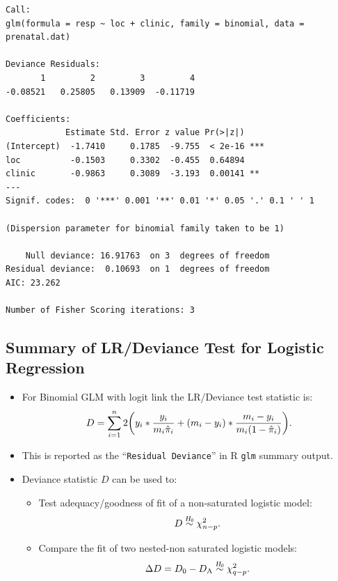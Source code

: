 \documentclass[oneside]{book}\usepackage[]{graphicx}\usepackage[svgnames]{xcolor}
\makeatletter
\newenvironment{kframe}{%
 \def\at@end@of@kframe{}%
 \ifinner\ifhmode%
  \def\at@end@of@kframe{\end{minipage}}%
  \begin{minipage}{\columnwidth}%
 \fi\fi%
 \def\FrameCommand##1{\hskip\@totalleftmargin \hskip-\fboxsep
 \colorbox{shadecolor}{##1}\hskip-\fboxsep
     \hskip-\linewidth \hskip-\@totalleftmargin \hskip\columnwidth}%
 \MakeFramed {\advance\hsize-\width
   \@totalleftmargin\z@ \linewidth\hsize
   \@setminipage}}%
 {\par\unskip\endMakeFramed%
 \at@end@of@kframe}
\newenvironment{knitrout}{}{} %
\let\log\relax%
\newcommand{\HN}{\textsl{H}_{\textsl{0}}}%
\makeatother
\begin{document}
\begin{itemize}
\begin{knitrout}
\begin{kframe}
\begin{verbatim}
Call:
glm(formula = resp ~ loc + clinic, family = binomial, data = prenatal.dat)

Deviance Residuals: 
       1         2         3         4  
-0.08521   0.25805   0.13909  -0.11719  

Coefficients:
            Estimate Std. Error z value Pr(>|z|)    
(Intercept)  -1.7410     0.1785  -9.755  < 2e-16 ***
loc          -0.1503     0.3302  -0.455  0.64894    
clinic       -0.9863     0.3089  -3.193  0.00141 ** 
---
Signif. codes:  0 '***' 0.001 '**' 0.01 '*' 0.05 '.' 0.1 ' ' 1

(Dispersion parameter for binomial family taken to be 1)

    Null deviance: 16.91763  on 3  degrees of freedom
Residual deviance:  0.10693  on 1  degrees of freedom
AIC: 23.262

Number of Fisher Scoring iterations: 3
\end{verbatim}
\end{kframe}
\end{knitrout}
\end{itemize}
\subsection*{Summary of LR/Deviance Test for Logistic Regression}
\begin{itemize}
      \item For Binomial GLM with logit link the LR/Deviance test statistic is:
            \[ D=\sum_{i=1}^{n} 2\biggl(y_i\log*{\frac{y_i}{m_i\hat{\pi}_i}}+(m_i-y_i)\log*{\frac{m_i-y_i}{m_i(1-\hat{\pi}_i)}}\biggr). \]
      \item This is reported as the ``\texttt{Residual Deviance}'' in R \texttt{glm} summary output.
      \item Deviance statistic $ D $ can be used to:
            \begin{itemize}
                  \item Test adequacy/goodness of fit of a non-saturated logistic model:
                        \[ D \stackrel{\HN}{\sim}\chi^2_{n-p}. \]
                  \item Compare the fit of two nested-non saturated logistic models:
                        \[ \Delta D=D_0-D_\text{A} \stackrel{\HN}{\sim}\chi^2_{q-p}. \]
            \end{itemize}
\end{itemize}
\end{document}
